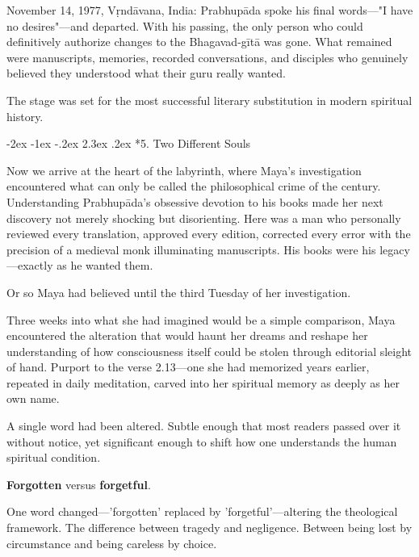 \documentclass[12pt,twoside]{book}
\makeatletter
\def\cleardoublepage{\clearpage\if@twoside \ifodd\c@page\else\hbox{}\thispagestyle{empty}\newpage\if@twocolumn\hbox{}\newpage\fi\fi\fi}
\renewcommand\section{\@startsection{section}{1}{\z@}%
{-2ex \@plus -1ex \@minus -.2ex}%
{2.3ex \@plus.2ex}%
{\normalfont\Large\bfseries}}
\makeatother
\begin{document}
November 14, 1977, Vṛndāvana, India: Prabhupāda spoke his final words—"I have no desires"—and departed. With his passing, the only person who could definitively authorize changes to the Bhagavad-gītā was gone. What remained were manuscripts, memories, recorded conversations, and disciples who genuinely believed they understood what their guru really wanted.

The stage was set for the most successful literary substitution in modern spiritual history.

\cleardoublepage
\vspace*{0.20\textheight}
\section*{5. Two Different Souls}
\thispagestyle{chapterpage}

\normalfont\justifying
Now we arrive at the heart of the labyrinth, where Maya's investigation encountered what can only be called the philosophical crime of the century. Understanding Prabhupāda's obsessive devotion to his books made her next discovery not merely shocking but disorienting. Here was a man who personally reviewed every translation, approved every edition, corrected every error with the precision of a medieval monk illuminating manuscripts. His books were his legacy—exactly as he wanted them.

Or so Maya had believed until the third Tuesday of her investigation.

Three weeks into what she had imagined would be a simple comparison, Maya encountered the alteration that would haunt her dreams and reshape her understanding of how consciousness itself could be stolen through editorial sleight of hand. Purport to the verse 2.13—one she had memorized years earlier, repeated in daily meditation, carved into her spiritual memory as deeply as her own name.

A single word had been altered. Subtle enough that most readers passed over it without notice, yet significant enough to shift how one understands the human spiritual condition.

\textbf{Forgotten} versus \textbf{forgetful}.

One word changed—'forgotten' replaced by 'forgetful'—altering the theological framework. The difference between tragedy and negligence. Between being lost by circumstance and being careless by choice.
\end{document}
